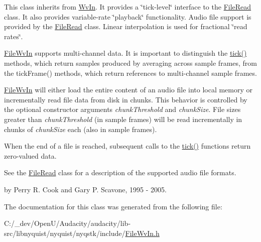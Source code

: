 This class inherits from \hyperlink{class_wv_in}{Wv\+In}. It provides a \char`\"{}tick-\/level\char`\"{} interface to the \hyperlink{class_file_read}{File\+Read} class. It also provides variable-\/rate \char`\"{}playback\char`\"{} functionality. Audio file support is provided by the \hyperlink{class_file_read}{File\+Read} class. Linear interpolation is used for fractional \char`\"{}read
rates\char`\"{}.

\hyperlink{class_file_wv_in}{File\+Wv\+In} supports multi-\/channel data. It is important to distinguish the \hyperlink{instr_8cpp_a02d20b725355812062c8b0c91b172b61}{tick()} methods, which return samples produced by averaging across sample frames, from the tick\+Frame() methods, which return references to multi-\/channel sample frames.

\hyperlink{class_file_wv_in}{File\+Wv\+In} will either load the entire content of an audio file into local memory or incrementally read file data from disk in chunks. This behavior is controlled by the optional constructor arguments {\itshape chunk\+Threshold} and {\itshape chunk\+Size}. File sizes greater than {\itshape chunk\+Threshold} (in sample frames) will be read incrementally in chunks of {\itshape chunk\+Size} each (also in sample frames).

When the end of a file is reached, subsequent calls to the \hyperlink{instr_8cpp_a02d20b725355812062c8b0c91b172b61}{tick()} functions return zero-\/valued data.

See the \hyperlink{class_file_read}{File\+Read} class for a description of the supported audio file formats.

by Perry R. Cook and Gary P. Scavone, 1995 -\/ 2005. 

The documentation for this class was generated from the following file\+:\begin{DoxyCompactItemize}
\item 
C\+:/\+\_\+dev/\+Open\+U/\+Audacity/audacity/lib-\/src/libnyquist/nyquist/nyqstk/include/\hyperlink{_file_wv_in_8h}{File\+Wv\+In.\+h}\end{DoxyCompactItemize}
